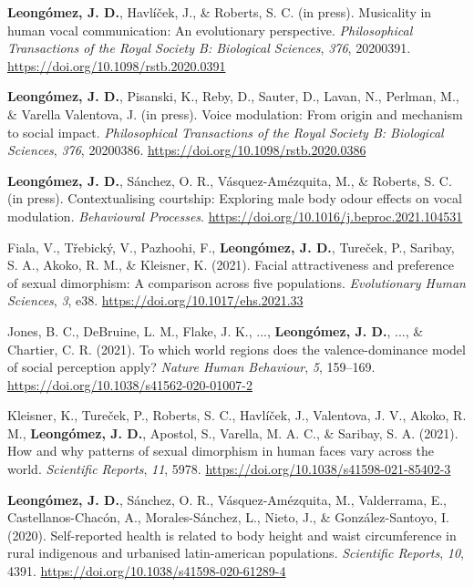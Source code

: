 \documentclass[11pt, a4paper]{awesome-cv}
\begin{document}
\leavevmode{}%
\textbf{Leongómez, J. D.}, Havlíček, J., \& Roberts, S. C. (in press).
Musicality in human vocal communication: {An} evolutionary perspective.
\emph{Philosophical Transactions of the Royal Society B: Biological
Sciences}, \emph{376}, 20200391.
\url{https://doi.org/10.1098/rstb.2020.0391}

\leavevmode{}%
\textbf{Leongómez, J. D.}, Pisanski, K., Reby, D., Sauter, D., Lavan,
N., Perlman, M., \& Varella Valentova, J. (in press). Voice modulation:
{From} origin and mechanism to social impact. \emph{Philosophical
Transactions of the Royal Society B: Biological Sciences}, \emph{376},
20200386. \url{https://doi.org/10.1098/rstb.2020.0386}

\leavevmode{}%
\textbf{Leongómez, J. D.}, Sánchez, O. R., Vásquez-Amézquita, M., \&
Roberts, S. C. (in press). Contextualising courtship: Exploring male
body odour effects on vocal modulation. \emph{Behavioural Processes}.
\url{https://doi.org/10.1016/j.beproc.2021.104531}

\leavevmode{}%
Fiala, V., Třebický, V., Pazhoohi, F., \textbf{Leongómez, J. D.},
Tureček, P., Saribay, S. A., Akoko, R. M., \& Kleisner, K. (2021).
Facial attractiveness and preference of sexual dimorphism: A comparison
across five populations. \emph{Evolutionary Human Sciences}, \emph{3},
e38. \url{https://doi.org/10.1017/ehs.2021.33}

\leavevmode{}%
Jones, B. C., DeBruine, L. M., Flake, J. K., ...,
\textbf{Leongómez, J. D.}, ..., \& Chartier, C. R. (2021). {To which
world regions does the valence-dominance model of social perception
apply?} \emph{Nature Human Behaviour}, \emph{5}, 159--169.
\url{https://doi.org/10.1038/s41562-020-01007-2}

\leavevmode{}%
Kleisner, K., Tureček, P., Roberts, S. C., Havlíček, J., Valentova, J.
V., Akoko, R. M., \textbf{Leongómez, J. D.}, Apostol, S., Varella, M. A.
C., \& Saribay, S. A. (2021). How and why patterns of sexual dimorphism
in human faces vary across the world. \emph{Scientific Reports},
\emph{11}, 5978. \url{https://doi.org/10.1038/s41598-021-85402-3}

\leavevmode{}%
\textbf{Leongómez, J. D.}, Sánchez, O. R., Vásquez-Amézquita, M.,
Valderrama, E., Castellanos-Chacón, A., Morales-Sánchez, L., Nieto, J.,
\& González-Santoyo, I. (2020). Self-reported health is related to body
height and waist circumference in rural indigenous and urbanised
latin-american populations. \emph{Scientific Reports}, \emph{10}, 4391.
\url{https://doi.org/10.1038/s41598-020-61289-4}
\end{document}
